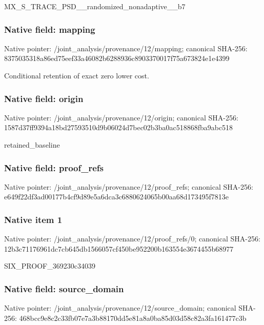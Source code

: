 \documentclass[10pt,a4paper]{article}
\begin{document}
\begingroup\raggedright\sloppy MX\_\allowbreak{}S\_\allowbreak{}TRACE\_\allowbreak{}PSD\_\allowbreak{}\_\allowbreak{}randomized\_\allowbreak{}nonadaptive\_\allowbreak{}\_\allowbreak{}b7\par\endgroup

\subsubsection{Native field: mapping}
Native pointer: /joint\_\allowbreak{}analysis/provenance/12/mapping; canonical SHA-256: 8375035318a86ed75eef33a46082b6288936c8903370017f75a673824e1e4399

\begingroup\raggedright\sloppy Conditional retention of exact zero lower cost.\par\endgroup

\subsubsection{Native field: origin}
Native pointer: /joint\_\allowbreak{}analysis/provenance/12/origin; canonical SHA-256: 1587d37ff9394a18bd27593510d9b06024d7bec02b3ba0ac518868fba9abc518

\begingroup\raggedright\sloppy retained\_\allowbreak{}baseline\par\endgroup

\subsubsection{Native field: proof\_\allowbreak{}refs}
Native pointer: /joint\_\allowbreak{}analysis/provenance/12/proof\_\allowbreak{}refs; canonical SHA-256: e649f22df3ad00177b4cf9d89e5a6dca3c6880624065b00aa68d173495f7813e

\subsubsection{Native item 1}
Native pointer: /joint\_\allowbreak{}analysis/provenance/12/proof\_\allowbreak{}refs/0; canonical SHA-256: 12b3c71176961dc7cb645db1566057cf450be952200b163554e3674455b68977

\begingroup\raggedright\sloppy SIX\_\allowbreak{}PROOF\_\allowbreak{}369230c34039\par\endgroup

\subsubsection{Native field: source\_\allowbreak{}domain}
Native pointer: /joint\_\allowbreak{}analysis/provenance/12/source\_\allowbreak{}domain; canonical SHA-256: 468bcc9e8c2c33fb07e7a3b88170dd5e81a8a0ba85d03d58c82a3fa161477c3b
\end{document}
